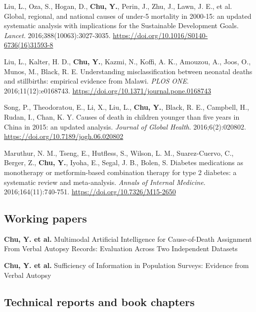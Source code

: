 \documentclass[
  11pt,
  letterpaper,
]{article}
\begin{document}
\begin{etaremune}
\item Liu, L., Oza, S., Hogan, D., \textbf{Chu, Y.}, Perin, J., Zhu, J., Lawn, J. E., et al. Global, regional, and national causes of under-5 mortality in 2000-15: an updated systematic analysis with implications for the Sustainable Development Goals. \emph{Lancet}. 2016;388(10063):3027-3035. \url{https://doi.org/10.1016/S0140-6736(16)31593-8}
\item Liu, L., Kalter, H. D., \textbf{Chu, Y.}, Kazmi, N., Koffi, A. K., Amouzou, A., Joos, O., Munos, M., Black, R. E. Understanding misclassification between neonatal deaths and stillbirths: empirical evidence from Malawi. \emph{PLOS ONE}. 2016;11(12):e0168743. \url{https://doi.org/10.1371/journal.pone.0168743}
\item Song, P., Theodoratou, E., Li, X., Liu, L., \textbf{Chu, Y.}, Black, R. E., Campbell, H., Rudan, I., Chan, K. Y. Causes of death in children younger than five years in China in 2015: an updated analysis. \emph{Journal of Global Health}. 2016;6(2):020802. \url{https://doi.org/10.7189/jogh.06.020802}
\item Maruthur, N. M., Tseng, E., Hutfless, S., Wilson, L. M., Suarez-Cuervo, C., Berger, Z., \textbf{Chu, Y.}, Iyoha, E., Segal, J. B., Bolen, S. Diabetes medications as monotherapy or metformin-based combination therapy for type 2 diabetes: a systematic review and meta-analysis. \emph{Annals of Internal Medicine}. 2016;164(11):740-751. \url{https://doi.org/10.7326/M15-2650}
\end{etaremune}

\subsection{Working papers}\label{working-papers}

\begin{etaremune}
\item \textbf{Chu, Y. et al.} Multimodal Artificial Intelligence for Cause-of-Death Assignment From Verbal Autopsy Records: Evaluation Across Two Independent Datasets
\item \textbf{Chu, Y. et al.} Sufficiency of Information in Population Surveys: Evidence from Verbal Autopsy

\end{etaremune}

\subsection{Technical reports and book
chapters}\label{technical-reports-and-book-chapters}
\end{document}

